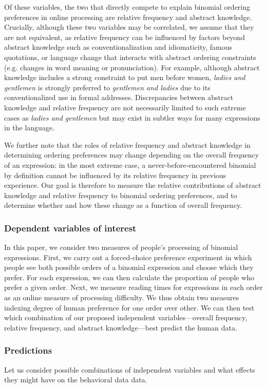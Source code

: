 \documentclass[authoryear]{elsarticle}
\begin{document}
Of these variables, the two that directly compete to explain binomial ordering preferences in online processing are relative frequency and abstract knowledge. Crucially, although these two variables may be correlated, we assume that they are not equivalent, as relative frequency can be influenced by factors beyond abstract knowledge such as conventionalization and idiomaticity, famous quotations, or language change that interacts with abstract ordering constraints (e.g. changes in word meaning or pronunciation). For example, although abstract knowledge includes a strong constraint to put men before women, \emph{ladies and gentlemen} is strongly preferred to \emph{gentlemen and ladies} due to its conventionalized use in formal addresses. Discrepancies between abstract knowledge and relative frequency are not necessarily limited to such extreme cases as \emph{ladies and gentlemen} but may exist in subtler ways for many expressions in the language.

We further note that the roles of relative frequency and abstract knowledge in determining ordering preferences may change depending on the overall frequency of an expression: in the most extreme case, a never-before-encountered binomial by definition cannot be influenced by its relative frequency in previous experience. Our goal is therefore to measure the relative contributions of abstract knowledge and relative frequency to binomial ordering preferences, and to determine whether and how these change as a function of overall frequency.

\subsubsection{Dependent variables of interest}

In this paper, we consider two measures of people's processing of binomial expressions. First, we carry out a forced-choice preference experiment in which people see both possible orders of a binomial expression and choose which they prefer. For each expression, we can then calculate the proportion of people who prefer a given order. Next, we measure reading times for expressions in each order as an online measure of processing difficulty. We thus obtain two measures indexing degree of human preference for one order over other. We can then test which combination of our proposed independent variables---overall frequency, relative frequency, and abstract knowledge---best predict the human data.

\subsubsection{Predictions}\label{predictions}
Let us consider possible combinations of independent variables and what effects they might have on the behavioral data data.
\end{document}
